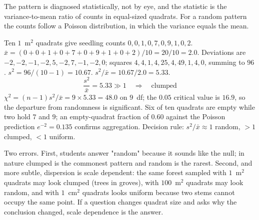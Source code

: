 The pattern is diagnosed statistically, not by eye, and the statistic is the
variance-to-mean ratio of counts in equal-sized quadrats. For a random pattern
the counts follow a Poisson distribution, in which the variance equals the mean.

\begin{calcbox}[title={WORKED: diagnosing dispersion from the variance-to-mean ratio}]
Ten $1$~m$^2$ quadrats give seedling counts $0,0,1,0,7,0,9,1,0,2$.
 $\bar{x}=(0+0+1+0+7+0+9+1+0+2)/10=20/10=2.0$.
 Deviations are $-2,-2,-1,-2,5,-2,7,-1,-2,0$;
squares $4,4,1,4,25,4,49,1,4,0$, summing to $96$.
 $s^2=96/(10-1)=10.67$.
 $s^2/\bar{x}=10.67/2.0=5.33$.
\[
\frac{s^2}{\bar{x}}=5.33\gg 1 \quad\Rightarrow\quad \text{clumped}
\]
 $\chi^2=(n-1)s^2/\bar{x}=9\times 5.33=48.0$ on
$9$~df; the $0.05$ critical value is $16.9$, so the departure from randomness is
significant.
 Six of ten quadrats are empty while two hold $7$ and $9$; an
empty-quadrat fraction of $0.60$ against the Poisson prediction
$e^{-2}=0.135$ confirms aggregation. Decision rule:
$s^2/\bar{x}\approx 1$ random, $>1$ clumped, $<1$ uniform. \tm{$\surd$}
\end{calcbox}

\begin{warnbox}[title={TRAP: clumped is the default, and scale changes the answer}]
Two errors. First, students answer "random" because it sounds like the null; in
nature clumped is the commonest pattern and random is the rarest. Second, and more
subtle, dispersion is scale dependent: the same forest sampled with $1$~m$^2$
quadrats may look clumped (trees in groves), with $100$~m$^2$ quadrats may look
random, and with $1$~cm$^2$ quadrats looks uniform because two stems cannot
occupy the same point. If a question changes quadrat size and asks why the
conclusion changed, scale dependence is the answer.
\end{warnbox}

